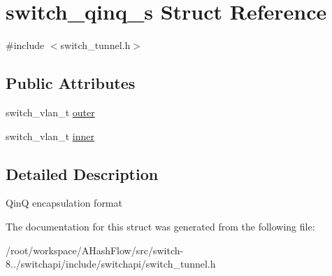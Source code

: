 \hypertarget{structswitch__qinq__s}{\section{switch\+\_\+qinq\+\_\+s Struct Reference}
\label{structswitch__qinq__s}
}


{\ttfamily \#include $<$switch\+\_\+tunnel.\+h$>$}

\subsection*{Public Attributes}
\begin{DoxyCompactItemize}
\item 
switch\+\_\+vlan\+\_\+t \hyperlink{group__Tunnel_ga49a0974681b01e892b9518aa253488df}{outer}
\item 
switch\+\_\+vlan\+\_\+t \hyperlink{group__Tunnel_gaf1d9443f4c5a0701ae353c0917065ab8}{inner}
\end{DoxyCompactItemize}


\subsection{Detailed Description}
Qin\+Q encapsulation format 

The documentation for this struct was generated from the following file\+:\begin{DoxyCompactItemize}
\item 
/root/workspace/\+A\+Hash\+Flow/src/switch-\/8../switchapi/include/switchapi/switch\+\_\+tunnel.\+h\end{DoxyCompactItemize}
